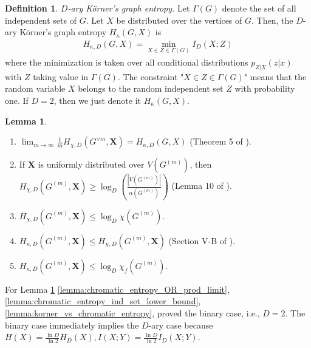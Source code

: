 \documentclass[journal, onecolumn, draftcls]{IEEEtran}
\theoremstyle{definition}
\newtheorem{lemma}{Lemma}
\newtheorem{definition}{Definition}
\newcommand{\bfX}{\mathbf{X}}
\newcommand{\meng}[1]{\marginpar{+}{\bf Ruoyu's remark}: {\em #1}}
\newcommand{\aditya}[1]{\marginpar{+}{\bf Aditya's remark}: {\em #1}}
\begin{document}
\begin{definition}{\it $D$-ary K\"orner's graph entropy.} 
\label{def:korner_entropy}
Let $\Gamma(G)$ denote the set of all independent sets of $G$. Let $X$ be distributed over the vertices of $G$. Then, the $D$-ary K\"orner's graph entropy $H_{\kappa}(G,X)$ is 
\begin{align*}
    H_{\kappa,D}(G,X)=\min_{X\in Z\in\Gamma(G)}I_D(X;Z)
\end{align*}
where   the minimization is taken over all conditional distributions $p_{Z|X}(z|x)$ with $Z$ taking value in $\Gamma(G)$. The constraint "$X\in Z\in\Gamma(G)$"  means that  the random variable $X$ belongs to the random independent set $Z$ with probability one. If $D=2$, then we just denote it $H_{\kappa}(G,X)$.
\end{definition} 
\begin{lemma} \label{lemma:graph_entropy}
\begin{enumerate}[label=(\alph*)]
    \item $\lim_{m\to \infty}\frac{1}{m}H_{\chi,D}(G^{\lor m},\bfX) = H_{\kappa,D}(G,X)$ (Theorem 5 of \cite{AlonO_96}). \label{lemma:chromatic_entropy_OR_prod_limit}
    \item If $\bfX$ is uniformly distributed over   $V(G^{(m)})$, then $H_{\chi,D}(G^{(m)},\bfX) \ge \log_D \left(\frac{|V(G^{(m)})|}{\alpha(G^{(m)})}\right)$ (Lemma 10 of \cite{AlonO_96}).\label{lemma:chromatic_entropy_ind_set_lower_bound}
    \item  $H_{\chi,D}(G^{(m)},\bfX) \le \log_D \chi(G^{(m)}).$   \label{lemma:chromatic_entropy_chi_upper_bound}
    \item  $H_{\kappa,D}(G^{(m)},\bfX) \le H_{\chi,D}(G^{(m)},\bfX)$ (Section V-B of \cite{AlonO_96}). \label{lemma:korner_vs_chromatic_entropy}
    \item $H_{\kappa,D}(G^{(m)},\bfX) \le \log_D \chi_f(G^{(m)})$. \label{lemma:korner_entropy_chi_f_upper_bound}
\end{enumerate}
\end{lemma} 
For  Lemma \ref{lemma:graph_entropy} \ref{lemma:chromatic_entropy_OR_prod_limit}, \ref{lemma:chromatic_entropy_ind_set_lower_bound}, \ref{lemma:korner_vs_chromatic_entropy}, \cite{AlonO_96} proved the binary case, i.e., $D=2$. The binary case immediately implies the $D$-ary case because $H(X) = \frac{\ln D}{\ln 2}H_D(X),I(X;Y) = \frac{\ln D}{\ln 2}I_D(X;Y).$
\end{document}
